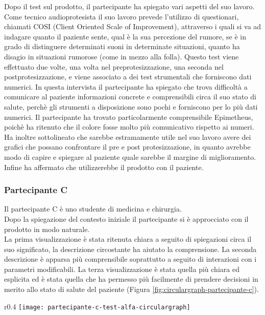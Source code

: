 Dopo il test sul prodotto, il partecipante ha spiegato vari aspetti del suo lavoro. Come tecnico audioprotesista il suo lavoro prevede l'utilizzo di questionari, chiamati COSI (Client Oriented Scale of Improvement), attraverso i quali si va ad indagare quanto il paziente sente, qual è la sua percezione del rumore, se è in grado di distinguere determinati suoni in determinate situazioni, quanto ha disagio in situazioni rumorose (come in mezzo alla folla). Questo test viene effettuato due volte, una volta nel preprotesizzazione, una seconda nel postprotesizzazione, e viene associato a dei test strumentali che forniscono dati numerici. In questa intervista il partecipante ha spiegato che trova difficoltà a comunicare al paziente informazioni concrete e comprensibili circa il suo stato di salute, perchè gli strumenti a disposizione sono pochi e forniscono per lo più dati numerici. Il partecipante ha trovato particolarmente comprensibile Epimetheus, poichè ha ritenuto che il colore fosse molto più comunicativo rispetto ai numeri. Ha inoltre sottolineato che sarebbe estramamente utile nel suo lavoro avere dei grafici che possano confrontare il pre e post protesizzazione, in quanto avrebbe modo di capire e spiegare al paziente quale sarebbe il margine di miglioramento.\\ Infine ha affermato che utilizzerebbe il prodotto con il paziente. 

\subsubsection{Partecipante C}
Il partecipante C è uno studente di medicina e chirurgia. \\
Dopo la spiegazione del contesto iniziale il partecipante si è approcciato con il prodotto in modo naturale.\\
La prima visualizzazione è stata ritenuta chiara a seguito di spiegazioni circa il suo significato, la descrizione circostante ha aiutato la comprensione. La seconda descrizione è apparsa più comprensibile soprattutto a seguito di interazioni con i parametri modificabili. La terza visualizzazione è stata quella più chiara ed esplicita ed è stata quella che ha permesso più facilmente di prendere decisioni in merito allo stato di salute del paziente (Figura \ref{fig:circulargraph-partecipante-c}). \\

\begin{wrapfigure}{r}{0.4\textwidth}
    \centering
    \texttt{[image: partecipante-c-test-alfa-circulargraph]}
    \caption{Circulargraph del test Alfa condotto dal partecipante C}
    \caption*{In questo test si è indagato l'ambito dell'operazione al ginocchio}
    \label{fig:circulargraph-partecipante-c}
\end{wrapfigure}

